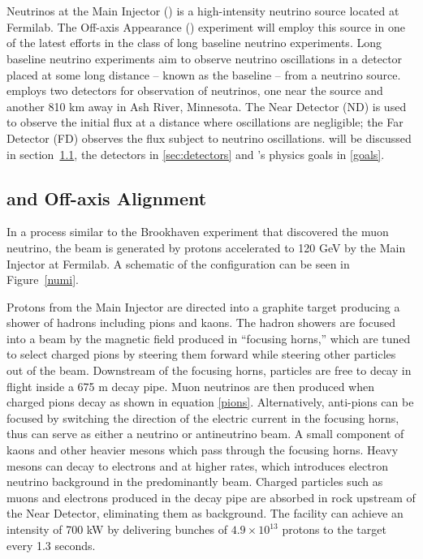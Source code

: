 \chapter{\nova}
\label{nova_chapter}
Neutrinos at the Main Injector (\numi) is a high-intensity neutrino source located at Fermilab.  The \numi Off-axis \nue Appearance (\nova) experiment will employ this source in one of the latest efforts in the class of long baseline neutrino experiments.  Long baseline neutrino experiments aim to observe neutrino oscillations in a detector placed at some long distance -- known as the baseline -- from a neutrino source.  \nova employs two detectors for observation of neutrinos, one near the source and another 810 km away in Ash River, Minnesota.  The Near Detector (ND) is used to observe the initial  \numi flux at a distance where oscillations are negligible; the Far Detector (FD) observes the \numi flux subject to neutrino oscillations.  \numi will be discussed in section~\ref{sec:numi}, the detectors in \ref{sec:detectors} and \nova's physics goals in \ref{goals}. 

\section{\numi and  Off-axis Alignment }\label{sec:numi}

In a process similar to the Brookhaven experiment that discovered the muon neutrino, the \numi beam is generated by protons accelerated to 120 GeV by the Main Injector at Fermilab.  A schematic of the \numi configuration can be seen in Figure~\ref{numi}.  

Protons from the Main Injector are directed into a graphite target producing a shower of hadrons including pions and kaons.  The hadron showers are focused into a beam by the magnetic field produced in ``focusing horns,'' which are tuned to select charged pions by steering them forward while steering other particles out of the beam.  Downstream of the focusing horns, particles are free to decay in flight inside a 675 m decay pipe.  Muon neutrinos are then produced when charged pions decay as shown in equation \eqref{pions}.  Alternatively, anti-pions can be focused by switching the direction of the electric current in the focusing horns, thus \numi can serve as either a neutrino or antineutrino beam.  A small component of kaons and other heavier mesons which pass through the focusing horns.  Heavy mesons can decay to electrons and \nue at higher rates, which introduces electron neutrino background in the predominantly \numu beam.  Charged particles such as muons and electrons produced in the decay pipe are absorbed in rock upstream of the \nova Near Detector, eliminating them as background.  The \numi facility can achieve an intensity of 700 kW by delivering bunches of $4.9 \times 10^{13}$ protons to the target every 1.3 seconds.\cite{tdr}

